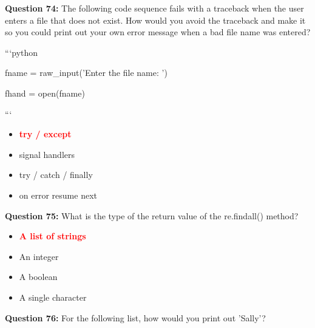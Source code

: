 \documentclass[12pt,a4paper]{article}
\begin{document}
\vspace{0.5cm}

\textbf{Question 74:} The following code sequence fails with a traceback when the user enters a file that does not exist. How would you avoid the traceback and make it so you could print out your own error message when a bad file name was entered?\newline

\newline
\newline

\newline
```python\newline

\newline
fname = raw_input('Enter the file name: ')\newline

\newline
fhand = open(fname)\newline

\newline
```

\begin{itemize}
    \item[\textbf{A.}] \textcolor{red}{\textbf{try / except}}
    \item[\textbf{B.}] signal handlers
    \item[\textbf{C.}] try / catch / finally
    \item[\textbf{D.}] on error resume next
\end{itemize}

\vspace{0.5cm}

\textbf{Question 75:} What is the type of the return value of the re.findall() method?

\begin{itemize}
    \item[\textbf{A.}] \textcolor{red}{\textbf{A list of strings}}
    \item[\textbf{B.}] An integer
    \item[\textbf{C.}] A boolean
    \item[\textbf{D.}] A single character
\end{itemize}

\vspace{0.5cm}

\textbf{Question 76:} For the following list, how would you print out 'Sally'?\newline
\end{document}
